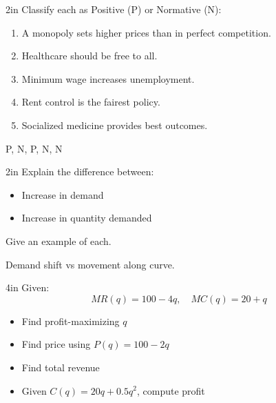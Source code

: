 \documentclass[12pt]{exam}
\begin{document}
\begin{questions}

  \begin{problem}[10]{2in}
    Classify each as Positive (P) or Normative (N):

    \begin{enumerate}
      \item A monopoly sets higher prices than in perfect competition.
      \item Healthcare should be free to all.
      \item Minimum wage increases unemployment.
      \item Rent control is the fairest policy.
      \item Socialized medicine provides best outcomes.
    \end{enumerate}
  \end{problem}

  \begin{solution}
    P, N, P, N, N
  \end{solution}


  \begin{shortanswer}[5]{2in}
    Explain the difference between:
    \begin{itemize}
      \item Increase in demand
      \item Increase in quantity demanded
    \end{itemize}
    Give an example of each.
  \end{shortanswer}

  \begin{solution}
    Demand shift vs movement along curve.
  \end{solution}


  \begin{problem}[15]{4in}
    Given:
    \[
      MR(q) = 100 - 4q, \quad MC(q) = 20 + q
    \]

    \begin{itemize}
      \item Find profit-maximizing \( q \)
      \item Find price using \( P(q) = 100 - 2q \)
      \item Find total revenue
      \item Given \( C(q) = 20q + 0.5q^2 \), compute profit
    \end{itemize}
  \end{problem}


\end{questions}
\end{document}
